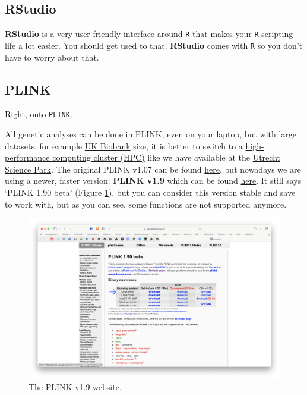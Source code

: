 \documentclass[
]{book}
\newcommand{\passthrough}[1]{#1}
\begin{document}
\renewcommand*{\arraystretch}{1}

\hypertarget{rstudio}{%
\subsection{RStudio}\label{rstudio}}

\textbf{RStudio} is a very user-friendly interface around \passthrough{\lstinline!R!} that makes your \passthrough{\lstinline!R!}-scripting-life a lot easier. You should get used to that. \textbf{RStudio} comes with \passthrough{\lstinline!R!} so you don't have to worry about that.

\hypertarget{plink}{%
\subsection{PLINK}\label{plink}}

Right, onto \passthrough{\lstinline!PLINK!}.

All genetic analyses can be done in PLINK, even on your laptop, but with large datasets, for example \href{https://www.ukbiobank.ac.uk}{UK Biobank} size, it is better to switch to a \href{https://en.wikipedia.org/wiki/High-performance_computing}{high-performance computing cluster (HPC)} like we have available at the \href{https://wiki.bioinformatics.umcutrecht.nl/bin/view/HPC/WebHome}{Utrecht Science Park}. The original PLINK v1.07 can be found \href{https://zzz.bwh.harvard.edu/plink/index.shtml}{here}, but nowadays we are using a newer, faster version: \textbf{PLINK v1.9} which can be found \href{https://www.cog-genomics.org/plink2}{here}. It still says `PLINK 1.90 beta' (Figure \ref{fig:plinkprogram}), but you can consider this version stable and save to work with, but as you can see, some functions are not supported anymore.

\begin{figure}[H]

{\centering \includegraphics[width=0.85\linewidth]{img/plink} 

}

\caption{The PLINK v1.9 website.}\label{fig:plinkprogram}
\end{figure}
\end{document}
